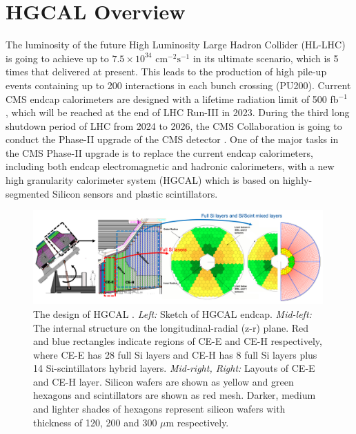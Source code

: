 
\section{HGCAL Overview}
\label{sec:hgcal:overview}


The luminosity of the future High Luminosity Large Hadron Collider (HL-LHC) is going to achieve up to $7.5\times 10^{34}$ $\text{cm}^{-2}\text{s}^{-1}$ \cite{hllhcweb} in its ultimate scenario, which is 5 times that delivered at present. This leads to the production of high pile-up events containing up to 200 interactions in each bunch crossing (PU200). Current CMS endcap calorimeters \cite{Chatrchyan:2008aa} are designed with a lifetime radiation limit of 500 fb$^{-1}$ \cite{CMSCollaboration:2015zni}, which will be reached at the end of LHC Run-III in 2023. During the third long shutdown period of LHC from 2024 to 2026, the CMS Collaboration is going to conduct the Phase-II upgrade of the CMS detector \cite{CMSCollaboration:2015zni}. One of the major tasks in the CMS Phase-II upgrade is to replace the current endcap calorimeters, including both endcap electromagnetic and hadronic calorimeters, with a new high granularity calorimeter system (HGCAL) which is based on highly-segmented Silicon sensors and plastic scintillators. 

\begin{figure}[ht]
    \centering
    \includegraphics[trim=0cm 0cm 0cm 0cm, clip,width=0.99\textwidth]{chapters/HGCal/figures/chep/hgcal2.png} 
    \caption{ The design of HGCAL \cite{Collaboration:2293646}. \emph{Left:} Sketch of HGCAL endcap. \emph{Mid-left:} The internal structure on the longitudinal-radial (z-r) plane. Red and blue rectangles indicate regions of CE-E and CE-H respectively, where CE-E has 28 full Si layers and CE-H has 8 full Si layers plus 14 Si-scintillators hybrid layers. \emph{Mid-right, Right:} Layouts of CE-E and CE-H layer. Silicon wafers are shown as yellow and green hexagons and scintillators are shown as red mesh. Darker, medium and lighter shades of hexagons represent silicon wafers with thickness of 120, 200 and 300 $\mu$m respectively.
    }
    \label{fig:hgcal}
\end{figure}

